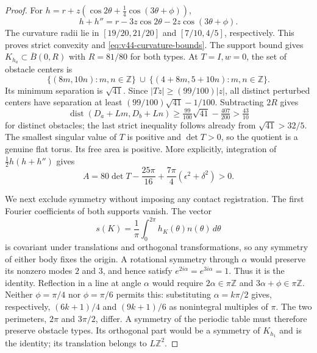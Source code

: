 \begin{proof}
For $h=r+z(\cos2\theta+\tfrac14\cos(3\theta+\phi))$,
\[
 h+h''=r-3z\cos2\theta-2z\cos(3\theta+\phi).
\]
The curvature radii lie in $[19/20,21/20]$ and $[7/10,4/5]$,
respectively.  This proves strict convexity and
\eqref{eq:v44-curvature-bounds}.  The support bound gives
$K_{h_a}\subset\overline B(0,R)$ with $R=81/80$ for both types.
At $T=I,w=0$, the set of obstacle centers is
\[
 \{(8m,10n):m,n\in\mathbb Z\}\ \cup\
 \{(4+8m,5+10n):m,n\in\mathbb Z\}.
\]
Its minimum separation is $\sqrt{41}$.  Since
$|Tz|\ge(99/100)|z|$, all distinct perturbed centers have separation
at least $(99/100)\sqrt{41}-1/100$.  Subtracting $2R$ gives
\[
 \operatorname{dist}(D_a+Lm,D_b+Ln)
 \ge\tfrac{99}{100}\sqrt{41}-\tfrac{407}{200}
 >\tfrac{43}{10}
\]
for distinct obstacles; the last strict inequality follows already from
$\sqrt{41}>32/5$.  The smallest singular value of $T$ is positive and
$\det T>0$, so the quotient is a genuine flat torus.  Its free area is
positive.  More explicitly, integration of
$\tfrac12h(h+h'')$ gives
\begin{equation}\label{eq:v44-free-area}
 A=80\det T-\frac{25\pi}{16}
                   +\frac{7\pi}{4}(\epsilon^2+\delta^2)>0.
\end{equation}

We next exclude symmetry without imposing any contact registration.
The first Fourier coefficients of both supports vanish.  The vector
\begin{equation}\label{eq:v44-center}
 s(K)=\frac1\pi\int_0^{2\pi}h_K(\theta)n(\theta)\,d\theta
\end{equation}
is covariant under translations and orthogonal transformations, so any
symmetry of either body fixes the origin.  A rotational symmetry through
$\alpha$ would preserve its nonzero modes $2$ and $3$, and hence satisfy
$e^{2i\alpha}=e^{3i\alpha}=1$.  Thus it is the identity.  Reflection in
a line at angle $\alpha$ would require
$2\alpha\in\pi\mathbb Z$ and $3\alpha+\phi\in\pi\mathbb Z$.
Neither $\phi=\pi/4$ nor $\phi=\pi/6$ permits this: substituting
$\alpha=k\pi/2$ gives, respectively, $(6k+1)/4$ and $(9k+1)/6$ as
nonintegral multiples of $\pi$.  The two perimeters, $2\pi$ and
$3\pi/2$, differ.  A symmetry of the periodic table must therefore
preserve obstacle types.  Its orthogonal part would be a symmetry of
$K_{h_1}$ and is the identity; its translation belongs to $L\mathbb Z^2$.


\end{proof}
